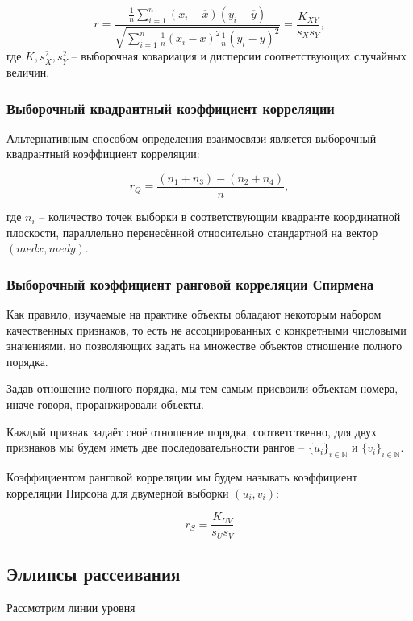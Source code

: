 \begin{equation}\label{eq:pearson}
	r = \frac{\frac{1}{n} \displaystyle \sum_{i=1}^{n}{\left(x_i - \overline{x}\right)\left(y_i - \overline{y}\right)}}{\sqrt{\displaystyle \sum_{i=1}^{n}{\frac{1}{n}\left(x_i - \overline{x}\right)^2\frac{1}{n}\left(y_i - \overline{y}\right)^2}}} = \frac{K_{XY}}{s_X s_Y},
\end{equation}
где $K, s_X^2, s_Y^2$ -- выборочная ковариация и дисперсии соответствующих случайных величин.

\subsubsection{Выборочный квадрантный коэффициент корреляции}
Альтернативным способом определения взаимосвязи является выборочный квадрантный коэффициент корреляции:

\begin{equation}\label{eq:rq}
	r_Q=\frac{(n_1 + n_3) - (n_2 + n_4)}{n},
\end{equation}

где $n_i$ -- количество точек выборки в соответствующим квадранте координатной плоскости, параллельно перенесённой относительно стандартной на вектор $(med x, med y)$.

\subsubsection{Выборочный коэффициент ранговой корреляции Спирмена}

Как правило, изучаемые на практике объекты обладают некоторым набором качественных признаков, то есть не ассоциированных с конкретными числовыми значениями, но позволяющих задать на множестве объектов отношение полного порядка.

Задав отношение полного порядка, мы тем самым присвоили объектам номера, иначе говоря, проранжировали объекты.

Каждый признак задаёт своё отношение порядка, соответственно, для двух признаков мы будем иметь две последовательности рангов -- $\{u_i\}_{i \in \mathbb{N}}$ и $\{v_i\}_{i \in \mathbb{N}}$.

Коэффициентом ранговой корреляции мы будем называть коэффициент корреляции Пирсона для двумерной выборки $(u_i, v_i)$:

\begin{equation}\label{eq:spearman}
	r_S = \frac{K_{UV}}{s_U s_V}
\end{equation}

\subsection{Эллипсы рассеивания}

Рассмотрим линии уровня